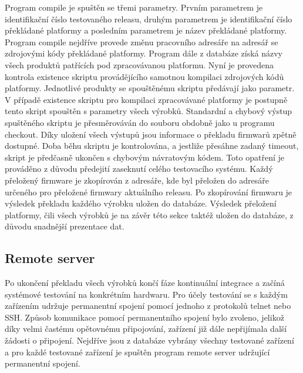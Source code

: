 Program compile je spuštěn se třemi parametry. Prvním parametrem je identifikační číslo testovaného releasu, druhým parametrem je identifikační číslo překládané platformy a posledním parametrem je název překládané platformy. Program compile nejdříve provede změnu pracovního adresáře na adresář se zdrojovými kódy překládané platformy. Program dále z databáze získá názvy všech produktů patřících pod zpracovávanou platformu. Nyní je provedena kontrola existence skriptu provádějícího samotnou kompilaci zdrojových kódů platformy. Jednotlivé produkty se spouštěnému skriptu předávají jako parametr. V případě existence skriptu pro kompilaci zpracovávané platformy je postupně tento skript spouštěn s parametry všech výrobků. Standardní a chybový výstup spuštěného skriptu je přesměrováván do souboru obdobně jako u programu checkout. Díky uložení všech výstupů jsou informace o překladu firmwarů zpětně dostupné. Doba běhu skriptu je kontrolována, a jestliže přesáhne zadaný timeout, skript je předčasně ukončen s chybovým návratovým kódem. Toto opatření je prováděno z důvodu předejití zaseknutí celého testovacího systému. Každý přeložený firmware je zkopírován z adresáře, kde byl přeložen do adresáře určeného pro přeložené firmwary aktuálního releasu. Po zkopírování firmwaru je výsledek překladu každého výrobku uložen do databáze. Výsledek přeložení platformy, čili všech výrobků je na závěr této sekce taktéž uložen do databáze, z důvodu snadnější prezentace dat.

\subsection{Remote server}
Po ukončení překladu všech výrobků končí fáze kontinuální integrace a začíná systémové testování na konkrétním hardwaru. Pro účely testování se s každým zařízením udržuje permanentní spojení pomocí jednoho z protokolů telnet nebo SSH. Způsob komunikace pomocí permanentního spojení bylo zvoleno, jelikož díky velmi častému opětovnému připojování, zařízení již dále nepřijímala další žádosti o připojení. Nejdříve jsou z databáze vybrány všechny testované zařízení a pro každé testované zařízení je spuštěn program remote server udržující permanentní spojení.


